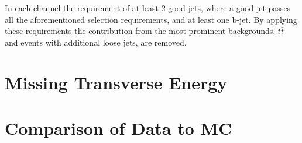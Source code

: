  In each channel the requirement of at least 2 good jets, where a good jet passes all the aforementioned selection requirements, and at least one b-jet. By applying these requirements the contribution from the most prominent backgrounds, $t\bar{t}$ and events with additional loose jets, are removed. 
 
\section{Missing Transverse Energy} \label{sec-METSelection}



\section{Comparison of Data to MC} \label{sec-dataMCcomparison}

